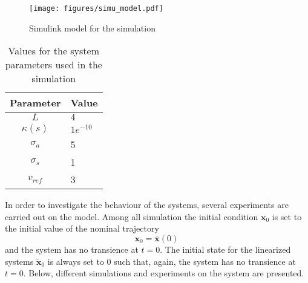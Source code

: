 \documentclass{scrartcl}
\newcommand{\bb}[1]{\boldsymbol{#1}}
\begin{document}
\begin{figure}[h]
	\centering
	\texttt{[image: figures/simu\_model.pdf]}
	\caption{Simulink model for the simulation}
	\label{fig:simu_simulink}
\end{figure}

\begin{table}[h]
	\centering
	\begin{tabular}{c|l}
	\hline
	\hline
	\textbf{Parameter} & \textbf{Value}\\
	\hline
	$L$ & $4$\\
	$\kappa (s)$ & $1e^{-10}$\\
	$\sigma_a$ & 5\\
	$\sigma_s$ & 1\\
	$v_{ref}$ & 3\\
	\hline
	\hline
	\end{tabular}
	\caption{Values for the system parameters used in the simulation}
	\label{tab:simu_param_values}
\end{table}
In order to investigate the behaviour of the systems, several experiments are carried out on the model.
Among all simulation the initial condition $\bb{x}_0$ is set to the initial value of the nominal trajectory 
\begin{equation}
	\bb{x}_0 = \bb{\bar{x}} (0) \, 
\end{equation}
and the system has no transience at $t = 0$. 
The initial state for the linearized systems $\bb{\tilde{x}}_0$ is always set to $0$ such that, again, the system has no transience at $t=0$.
Below, different simulations and experiments on the system are presented.
\end{document}
